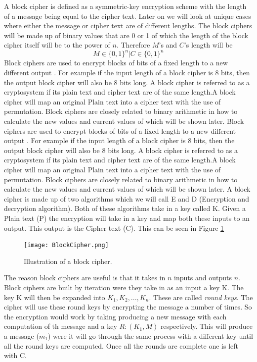 \documentclass[11pt,a4paper, notitlepage]{report}
\begin{document}
A block cipher is defined as a symmetric-key encryption scheme with the length of a message being equal to the cipher text. Later on we will look at unique cases where either the message or cipher text are of different lengths. The block ciphers will be made up of binary values that are 0 or 1 of which the length of the block cipher itself will be to the power of $n$. Therefore $M$'s and $C$'s length will be 
\begin{displaymath}
M \in \{0,1\}^{n} | C \in \{0,1\}^{n}
\end{displaymath}
Block ciphers are used to encrypt blocks of bits of a fixed length to a new different output \cite{DBLP:books/sp/Buchmann02}. For example if the input length of a block cipher is 8 bits, then the output block cipher will also be 8 bits long. A block cipher is referred to as a cryptosystem if its plain text and cipher text are of the same length.A block cipher will map an original Plain text into a cipher text with the use of permutation. Block ciphers are closely related to binary arithmetic in how to calculate the new values and current values of which will be shown later.
Block ciphers are used to encrypt blocks of bits of a fixed length to a new different output \cite{DBLP:books/sp/Buchmann02}. For example if the input length of a block cipher is 8 bits, then the output block cipher will also be 8 bits long. A block cipher is referred to as a cryptosystem if its plain text and cipher text are of the same length.A block cipher will map an original Plain text into a cipher text with the use of permutation. Block ciphers are closely related to binary arithmetic in how to calculate the new values and current values of which will be shown later.
A block cipher is made up of two algorithms which we will call E and D (Encryption and decryption algorithm). Both of these algorithms take in a key called K. Given a Plain text (P) the encryption will take in a key and map both these inputs to an output. This output is the Cipher text (C). This can be seen in Figure \ref*{fig:2.2.1}

\begin{figure}[H]
\centering
\texttt{[image: BlockCipher.png]}
\caption{Illustration of a block cipher.}
\label{fig:2.2.1}
\end{figure}


The reason block ciphers are useful is that it takes in $n$ inputs and outputs $n$. Block ciphers are built by iteration were they take in as an input a key K. The key K will then be expanded into $K_{1}, K_{2},..., K_{n}$. These are called \emph{round keys}. The cipher will use these round keys by encrypting the message a number of times. So the encryption would work by taking producing a new message with each computation of th message and a key $R: (K_{1}, M)$ respectively. This will produce a message ($m_{1}$) were it will go through the same process with a different key until all the round keys are computed. Once all the rounds are complete one is left with C.
\end{document}

